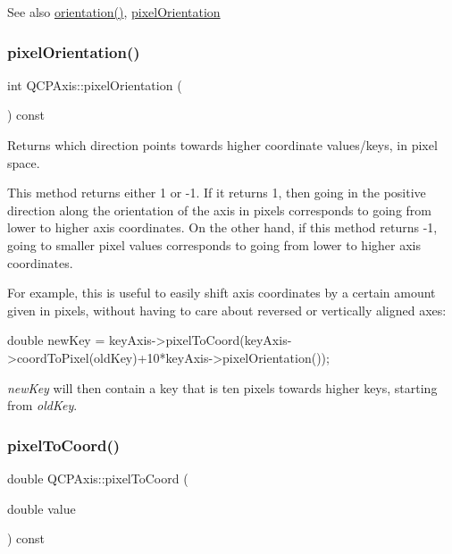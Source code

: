 \begin{DoxySeeAlso}{See also}
\hyperlink{class_q_c_p_axis_ab988ef4538e2655bb77bd138189cd42e}{orientation()}, \hyperlink{class_q_c_p_axis_a45c45bed7e5666683b8d56afa66fa51f}{pixel\+Orientation} 
\end{DoxySeeAlso}
\mbox{\label{class_q_c_p_axis_a45c45bed7e5666683b8d56afa66fa51f}} 
\subsubsection{\texorpdfstring{pixel\+Orientation()}{pixelOrientation()}}
{\footnotesize\ttfamily int Q\+C\+P\+Axis\+::pixel\+Orientation (\begin{DoxyParamCaption}{ }\end{DoxyParamCaption}) const\hspace{0.3cm}{\ttfamily [inline]}}

Returns which direction points towards higher coordinate values/keys, in pixel space.

This method returns either 1 or -\/1. If it returns 1, then going in the positive direction along the orientation of the axis in pixels corresponds to going from lower to higher axis coordinates. On the other hand, if this method returns -\/1, going to smaller pixel values corresponds to going from lower to higher axis coordinates.

For example, this is useful to easily shift axis coordinates by a certain amount given in pixels, without having to care about reversed or vertically aligned axes\+:


\begin{DoxyCode}
\textcolor{keywordtype}{double} newKey = keyAxis->pixelToCoord(keyAxis->coordToPixel(oldKey)+10*keyAxis->pixelOrientation());
\end{DoxyCode}


{\itshape new\+Key} will then contain a key that is ten pixels towards higher keys, starting from {\itshape old\+Key}. \mbox{\label{class_q_c_p_axis_a536ef8f624cac59b6b6fdcb495723c57}} 
\subsubsection{\texorpdfstring{pixel\+To\+Coord()}{pixelToCoord()}}
{\footnotesize\ttfamily double Q\+C\+P\+Axis\+::pixel\+To\+Coord (\begin{DoxyParamCaption}\item[{double}]{value }\end{DoxyParamCaption}) const}

